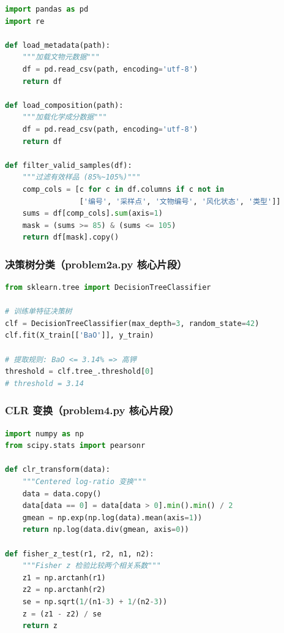 \begin{lstlisting}[language=Python, caption=数据加载与预处理]
import pandas as pd
import re

def load_metadata(path):
    """加载文物元数据"""
    df = pd.read_csv(path, encoding='utf-8')
    return df

def load_composition(path):
    """加载化学成分数据"""
    df = pd.read_csv(path, encoding='utf-8')
    return df

def filter_valid_samples(df):
    """过滤有效样品 (85%~105%)"""
    comp_cols = [c for c in df.columns if c not in
                 ['编号', '采样点', '文物编号', '风化状态', '类型']]
    sums = df[comp_cols].sum(axis=1)
    mask = (sums >= 85) & (sums <= 105)
    return df[mask].copy()
\end{lstlisting}

\subsubsection*{决策树分类（problem2a.py 核心片段）}

\begin{lstlisting}[language=Python, caption=决策树分类规则]
from sklearn.tree import DecisionTreeClassifier

# 训练单特征决策树
clf = DecisionTreeClassifier(max_depth=3, random_state=42)
clf.fit(X_train[['BaO']], y_train)

# 提取规则: BaO <= 3.14% => 高钾
threshold = clf.tree_.threshold[0]
# threshold = 3.14
\end{lstlisting}

\subsubsection*{CLR 变换（problem4.py 核心片段）}

\begin{lstlisting}[language=Python, caption=CLR 变换与相关分析]
import numpy as np
from scipy.stats import pearsonr

def clr_transform(data):
    """Centered log-ratio 变换"""
    data = data.copy()
    data[data == 0] = data[data > 0].min().min() / 2
    gmean = np.exp(np.log(data).mean(axis=1))
    return np.log(data.div(gmean, axis=0))

def fisher_z_test(r1, r2, n1, n2):
    """Fisher z 检验比较两个相关系数"""
    z1 = np.arctanh(r1)
    z2 = np.arctanh(r2)
    se = np.sqrt(1/(n1-3) + 1/(n2-3))
    z = (z1 - z2) / se
    return z
\end{lstlisting}
